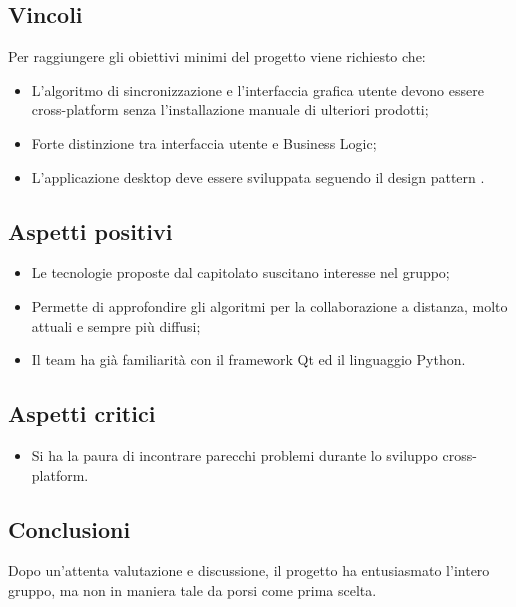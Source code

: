 \subsection{Vincoli}
Per raggiungere gli obiettivi minimi del progetto viene richiesto che:
\begin{itemize}
	\item L'algoritmo di sincronizzazione e l'interfaccia grafica utente devono essere cross-platform senza l'installazione manuale di ulteriori prodotti;
	\item Forte distinzione tra interfaccia utente e Business Logic;
	\item L'applicazione desktop deve essere sviluppata seguendo il design pattern .
\end{itemize}

\subsection{Aspetti positivi}
\begin{itemize}
	\item Le tecnologie proposte dal capitolato suscitano interesse nel gruppo;
	\item Permette di approfondire gli algoritmi per la collaborazione a distanza, molto attuali e sempre più diffusi;
	\item Il team ha già familiarità con il framework Qt ed il linguaggio Python.
\end{itemize}

\subsection{Aspetti critici}
\begin{itemize}
	\item Si ha la paura di incontrare parecchi problemi durante lo sviluppo cross-platform.
\end{itemize}

\subsection{Conclusioni}
Dopo un'attenta valutazione e discussione, il progetto ha entusiasmato l'intero gruppo, ma non in maniera tale da porsi come prima scelta.